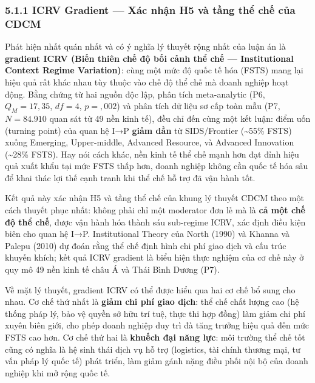 \documentclass[12pt,a4paper]{article}
\begin{document}
\hypertarget{511-icrv-gradient--xuxe1c-nhux1eadn-h5-vuxe0-tux1ea7ng-thux1ec3-chux1ebf-cux1ee7a-cdcm}{%
\subsubsection{5.1.1 ICRV Gradient --- Xác nhận H5 và tầng thể chế của
CDCM}\label{511-icrv-gradient--xuxe1c-nhux1eadn-h5-vuxe0-tux1ea7ng-thux1ec3-chux1ebf-cux1ee7a-cdcm}}

Phát hiện nhất quán nhất và có ý nghĩa lý thuyết rộng nhất của luận án
là \textbf{gradient ICRV (Biến thiên chế độ bối cảnh thể chế ---
Institutional Context Regime Variation)}: cùng một mức độ quốc tế hóa
(FSTS) mang lại hiệu quả rất khác nhau tùy thuộc vào chế độ thể chế mà
doanh nghiệp hoạt động. Bằng chứng từ hai nguồn độc lập, phân tích
meta-analytic (P6, \(Q_M = 17{,}35\), \(df = 4\), \(p = {,}002\)) và
phân tích dữ liệu sơ cấp toàn mẫu (P7, \(N = 84.910\) quan sát từ 49 nền
kinh tế), đều chỉ đến cùng một kết luận: điểm uốn (turning point) của
quan hệ I→P \textbf{giảm dần} từ SIDS/Frontier (\textasciitilde55\%
FSTS) xuống Emerging, Upper-middle, Advanced Resource, và Advanced
Innovation (\textasciitilde28\% FSTS). Hay nói cách khác, nền kinh tế
thể chế mạnh hơn đạt đỉnh hiệu quả xuất khẩu tại mức FSTS thấp hơn,
doanh nghiệp không cần quốc tế hóa sâu để khai thác lợi thế cạnh tranh
khi thể chế hỗ trợ đã vận hành tốt.

Kết quả này xác nhận H5 và tầng thể chế của khung lý thuyết CDCM theo
một cách thuyết phục nhất: không phải chỉ một moderator đơn lẻ mà là
\textbf{cả một chế độ thể chế}, được vận hành hóa thành sáu sub-regime
ICRV, xác định điều kiện biên cho quan hệ I→P. Institutional Theory của
North (1990) và Khanna và Palepu (2010) dự đoán rằng thể chế định hình
chi phí giao dịch và cấu trúc khuyến khích; kết quả ICRV gradient là
biểu hiện thực nghiệm của cơ chế này ở quy mô 49 nền kinh tế châu Á và
Thái Bình Dương (P7).

Về mặt lý thuyết, gradient ICRV có thể được hiểu qua hai cơ chế bổ sung
cho nhau. Cơ chế thứ nhất là \textbf{giảm chi phí giao dịch}: thể chế
chất lượng cao (hệ thống pháp lý, bảo vệ quyền sở hữu trí tuệ, thực thi
hợp đồng) làm giảm chi phí xuyên biên giới, cho phép doanh nghiệp duy
trì đà tăng trưởng hiệu quả đến mức FSTS cao hơn. Cơ chế thứ hai là
\textbf{khuếch đại năng lực}: môi trường thể chế tốt cũng có nghĩa là hệ
sinh thái dịch vụ hỗ trợ (logistics, tài chính thương mại, tư vấn pháp
lý quốc tế) phát triển, làm giảm gánh nặng điều phối nội bộ của doanh
nghiệp khi mở rộng quốc tế.
\end{document}
